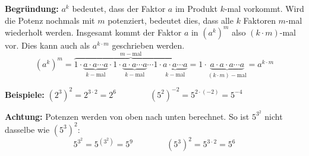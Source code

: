 \textbf{Begründung:} $a^{k}$ bedeutet, dass der Faktor $a$ im Produkt $k$-mal vorkommt. Wird die Potenz nochmals mit $m$ potenziert, bedeutet dies, dass alle $k$ Faktoren $m$-mal wiederholt werden. Insgesamt kommt der Faktor $a$ in $\left(a^{k}\right)^{m}$ also $(k\cdot m)$-mal vor. Dies kann auch als $a^{k\cdot m}$ geschrieben werden.
\[
  (a^{k})^{m} = \overbrace{1\cdot\underbrace{a\cdot a\cdots a}_{k-\text{mal}}\cdot 1\cdot\underbrace{a\cdot a\cdots a}_{k-\text{mal}}\cdots 1\cdot\underbrace{a\cdot a\cdots a}_{k-\text{mal}}}^{m-\text{mal}} = 1\cdot\underbrace{a\cdot a\cdot a\cdots a}_{(k\cdot m)-\text{mal}} = a^{k\cdot m}
\]

\begin{example}
  \textbf{Beispiele:} $\displaystyle (2^{3})^{2} = 2^{3\cdot 2} = 2^{6} \qquad\qquad (5^{2})^{-2} = 5^{2\cdot(-2)} = 5^{-4}$
\end{example}

\begin{note}
  \textbf{Achtung:} Potenzen werden von oben nach unten berechnet. So ist $5^{3^{2}}$ nicht dasselbe wie $\left(5^{3}\right)^{2}$:
  \[
    5^{3^{2}} = 5^{\left(3^{2}\right)} = 5^{9} \qquad\qquad \left(5^{3}\right)^{2} = 5^{3\cdot 2} = 5^{6}
  \]
\end{note}
